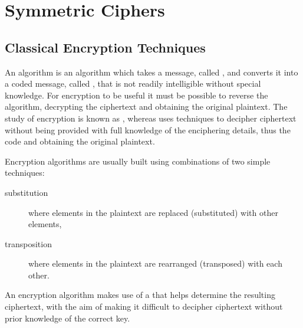 
\chapter{Symmetric Ciphers}


\section{Classical Encryption Techniques}


An  algorithm is an algorithm which takes a message,
called , and converts it into a coded message, called
, that is not readily intelligible without special knowledge.
For encryption to be useful it must be possible to reverse the algorithm,
decrypting the ciphertext and obtaining the original plaintext.
The study of encryption is known as , whereas
 uses techniques to decipher ciphertext
without being provided with full knowledge of the enciphering details,
thus  the code and obtaining the original plaintext.

Encryption algorithms are usually built using combinations of two simple techniques:
\begin{description}
  \item[substitution] where elements in the plaintext are replaced (substituted)
  with other elements,
  \item[transposition] where elements in the plaintext are rearranged (transposed)
  with each other.
\end{description}
An encryption algorithm makes use of a  that helps determine the
resulting ciphertext, with the aim of making it difficult to decipher ciphertext
without prior knowledge of the correct key.

